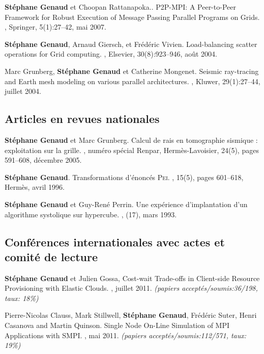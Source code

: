\documentclass[11pt]{article}
\begin{document}
\begin{thebibliography}{99}
\textbf{Stéphane Genaud} et Choopan Rattanapoka..
\newblock P2P-MPI: A Peer-to-Peer Framework for Robust Execution of Message Passing Parallel Programs on Grids.
, Springer, 5(1):27--42, mai 2007.


\textbf{Stéphane Genaud}, Arnaud Giersch, et Frédéric Vivien.
\newblock Load-balancing scatter operations for Grid computing.
, Elsevier, 30(8):923--946, août 2004.

Marc Grunberg, \textbf{Stéphane Genaud} et Catherine Mongenet.
\newblock Seismic ray-tracing and Earth mesh modeling on various parallel
  architectures.
, Kluwer, 29(1):27--44, juillet 2004.


\subsection*{Articles en revues nationales}
\textbf{Stéphane Genaud} et Marc Grunberg. 
\newblock  Calcul de rais en tomographie sismique : exploitation sur la grille.
, numéro spécial Renpar, 
Hermès-Lavoisier, 24(5), pages 591--608, décembre 2005.

\textbf{Stéphane Genaud}.
\newblock Transformations d'énoncés \textsc{Pei}.
, 15(5), pages 601--618, Hermès, avril 1996.

\textbf{Stéphane Genaud} et Guy-René Perrin.
\newblock Une expérience d'implantation d'un algorithme systolique sur
  hypercube.
,
  (17), mars 1993.


\subsection*{Conférences internationales avec actes et comité de lecture}

\newblock \textbf{Stéphane Genaud} et Julien Gossa,
\newblock Cost-wait Trade-offs in Client-side Resource Provisioning with Elastic Clouds.
, juillet 2011.
\newblock \small{\textit{(papiers acceptés/soumis{:}36/198, taux: 18\%)}}


\newblock Pierre-Nicolas Clauss, Mark Stillwell, \textbf{Stéphane Genaud}, Fr\'ed\'eric Suter,
Henri Casanova and  Martin Quinson.
\newblock Single Node On-Line Simulation of MPI Applications with SMPI.
, mai 2011.
\newblock \small{\textit{(papiers acceptés/soumis{:}112/571, taux: 19\%)}}


\end{thebibliography}
\end{document}
